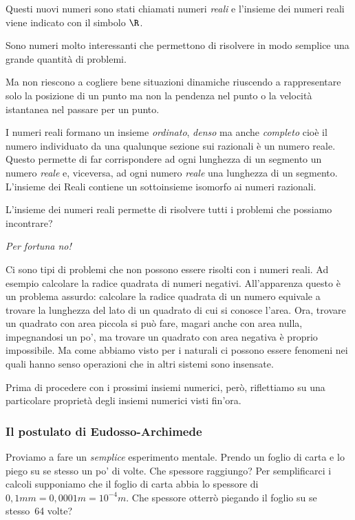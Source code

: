 Questi nuovi numeri sono stati chiamati numeri \emph{reali} e l'insieme dei 
numeri reali viene indicato con il simbolo \(\R\).

Sono numeri molto interessanti che permettono di risolvere in modo semplice 
una grande quantità di problemi.

Ma non riescono a cogliere bene situazioni dinamiche riuscendo a 
rappresentare solo la posizione di un punto ma non la pendenza nel punto o la 
velocità istantanea nel passare per un punto.

I numeri reali formano un insieme \emph{ordinato}, \emph{denso} ma anche 
\emph{completo} cioè il numero individuato da una qualunque sezione sui 
razionali è un numero reale.
Questo permette di far corrispondere ad ogni lunghezza di un segmento 
un numero \emph{reale} e, viceversa, ad ogni numero \emph{reale} una 
lunghezza di un segmento. 
L'insieme dei Reali contiene un sottoinsieme isomorfo ai numeri 
razionali.

L'insieme dei numeri reali permette di risolvere tutti i problemi che 
possiamo incontrare?
\vspace{-1em}
\begin{center} \emph{Per fortuna no!} \end{center}
\vspace{-.5em}
Ci sono tipi di problemi che non possono essere risolti con i numeri reali.
Ad esempio calcolare la radice quadrata di numeri negativi. 
All'apparenza questo è un problema assurdo: calcolare la 
radice quadrata di un numero equivale a trovare la lunghezza del lato di un 
quadrato di cui si conosce l'area. 
Ora, trovare un quadrato con area piccola si può fare, magari anche con 
area nulla, impegnandosi un po', ma trovare un quadrato con area negativa 
è proprio impossibile. 
Ma come abbiamo visto per i naturali ci possono essere fenomeni nei quali 
hanno senso operazioni che in altri sistemi sono insensate.

Prima di procedere con i prossimi insiemi numerici, però, riflettiamo su 
una particolare proprietà degli insiemi numerici visti fin'ora.

\subsubsection{Il postulato di Eudosso-Archimede}

Proviamo a fare un \emph{semplice} esperimento mentale. Prendo un foglio di 
carta e lo piego su se stesso un po' di volte. Che spessore raggiungo?
Per semplificarci i calcoli supponiamo che il foglio di carta abbia lo 
spessore di \(0,1mm = 0,0001m = 10^{-4}m\). 
Che spessore otterrò piegando il foglio su se stesso~64 volte?

